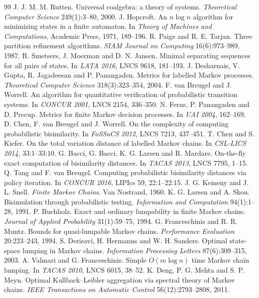 \documentclass[11pt]{article}
\theoremstyle{definition}
\theoremstyle{plain}
\begin{document}
\begin{thebibliography}{99}
 J. J. M. M. Rutten. Universal coalgebra: a theory of systems. \emph{Theoretical Computer Science} 249(1):3--80, 2000.
 J. Hopcroft. An $n\log n$ algorithm for minimizing states in a finite automaton. In \emph{Theory of Machines and Computations}, Academic Press, 1971, 189--196.
 R. Paige and R. E. Tarjan. Three partition refinement algorithms. \emph{SIAM Journal on Computing} 16(6):973--989, 1987.
 R. Smetsers, J. Moerman and D. N. Jansen. Minimal separating sequences for all pairs of states. In \emph{LATA 2016}, LNCS 9618, 181--193.
 J. Desharnais, V. Gupta, R. Jagadeesan and P. Panangaden. Metrics for labelled Markov processes. \emph{Theoretical Computer Science} 318(3):323--354, 2004.
 F. van Breugel and J. Worrell. An algorithm for quantitative verification of probabilistic transition systems. In \emph{CONCUR 2001}, LNCS 2154, 336--350.
 N. Ferns, P. Panangaden and D. Precup. Metrics for finite Markov decision processes. In \emph{UAI 2004}, 162--169.
 D. Chen, F. van Breugel and J. Worrell. On the complexity of computing probabilistic bisimilarity. In \emph{FoSSaCS 2012}, LNCS 7213, 437--451.
 T. Chen and S. Kiefer. On the total variation distance of labelled Markov chains. In \emph{CSL-LICS 2014}, 33:1--33:10.
 G. Bacci, G. Bacci, K. G. Larsen and R. Mardare. On-the-fly exact computation of bisimilarity distances. In \emph{TACAS 2013}, LNCS 7795, 1--15.
 Q. Tang and F. van Breugel. Computing probabilistic bisimilarity distances via policy iteration. In \emph{CONCUR 2016}, LIPIcs 59, 22:1--22:15.
 J. G. Kemeny and J. L. Snell. \emph{Finite Markov Chains}. Van Nostrand, 1960.
 K. G. Larsen and A. Skou. Bisimulation through probabilistic testing. \emph{Information and Computation} 94(1):1--28, 1991.
 P. Buchholz. Exact and ordinary lumpability in finite Markov chains. \emph{Journal of Applied Probability} 31(1):59--75, 1994.
 G. Franceschinis and R. R. Muntz. Bounds for quasi-lumpable Markov chains. \emph{Performance Evaluation} 20:223--243, 1994.
 S. Derisavi, H. Hermanns and W. H. Sanders. Optimal state-space lumping in Markov chains. \emph{Information Processing Letters} 87(6):309--315, 2003.
 A. Valmari and G. Franceschinis. Simple $O(m\log n)$ time Markov chain lumping. In \emph{TACAS 2010}, LNCS 6015, 38--52.
 K. Deng, P. G. Mehta and S. P. Meyn. Optimal Kullback--Leibler aggregation via spectral theory of Markov chains. \emph{IEEE Transactions on Automatic Control} 56(12):2793--2808, 2011.

\end{thebibliography}
\end{document}
